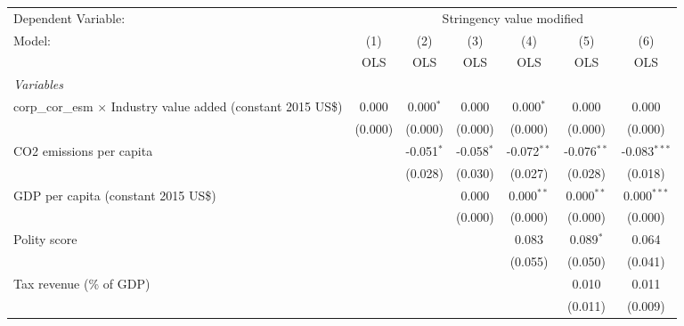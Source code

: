 
\begingroup
\centering
\begin{tabular}{lcccccc}
   \toprule
   Dependent Variable: & \multicolumn{6}{c}{Stringency value modified}\\
   Model:                                                                & (1)     & (2)          & (3)          & (4)           & (5)           & (6)\\  
                                                                         &  OLS    & OLS          & OLS          & OLS           & OLS           & OLS\\  
   \midrule
   \emph{Variables}\\
   corp\_cor\_esm $\times$ Industry value added (constant 2015 US\$)     & 0.000   & 0.000$^{*}$  & 0.000        & 0.000$^{*}$   & 0.000         & 0.000\\   
                                                                         & (0.000) & (0.000)      & (0.000)      & (0.000)       & (0.000)       & (0.000)\\   
   CO2 emissions per capita                                              &         & -0.051$^{*}$ & -0.058$^{*}$ & -0.072$^{**}$ & -0.076$^{**}$ & -0.083$^{***}$\\   
                                                                         &         & (0.028)      & (0.030)      & (0.027)       & (0.028)       & (0.018)\\   
   GDP per capita (constant 2015 US\$)                                   &         &              & 0.000        & 0.000$^{**}$  & 0.000$^{**}$  & 0.000$^{***}$\\   
                                                                         &         &              & (0.000)      & (0.000)       & (0.000)       & (0.000)\\   
   Polity score                                                          &         &              &              & 0.083         & 0.089$^{*}$   & 0.064\\   
                                                                         &         &              &              & (0.055)       & (0.050)       & (0.041)\\   
   Tax revenue (\% of GDP)                                               &         &              &              &               & 0.010         & 0.011\\   
                                                                         &         &              &              &               & (0.011)       & (0.009)\\   

\end{tabular}
